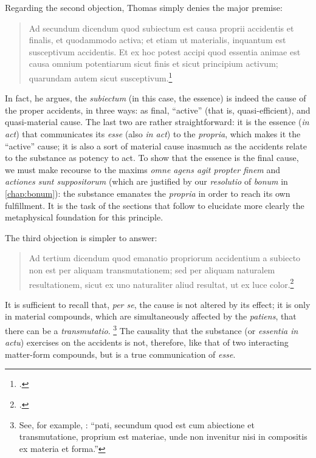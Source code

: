 Regarding the second objection, Thomas simply denies the major premise:
%
\begin{quotation}
Ad secundum dicendum quod subiectum est causa proprii accidentis et finalis, et quodammodo activa; et etiam ut materialis, inquantum est susceptivum accidentis. Et ex hoc potest accipi quod essentia animae est causa omnium potentiarum sicut finis et sicut principium activum; quarundam autem sicut susceptivum.\footcite[I, q.~77, a.~6, ad 2]{st:summa}
\end{quotation}
%
In fact, he argues, the \emph{subiectum} (in this case, the essence) is indeed the cause of the proper accidents, in three ways: as final, ``active'' (that is, quasi-efficient), and quasi-material cause. The last two are rather straightforward: it is the essence (\emph{in act}) that communicates its \emph{esse} (also \emph{in act}) to the \emph{propria}, which makes it the ``active'' cause; it is also a sort of material cause inasmuch as the accidents relate to the substance as potency to act. To show that the essence is the final cause, we must make recourse to the maxims \emph{omne agens agit propter finem} and \emph{actiones sunt suppositorum} (which are justified by our \emph{resolutio} of \emph{bonum} in \autoref{chap:bonum}): the substance emanates the \emph{propria} in order to reach its own fulfillment. It is the task of the sections that follow to elucidate more clearly the metaphysical foundation for this principle.

The third objection is simpler to answer: 
%
\begin{quotation}
Ad tertium dicendum quod emanatio propriorum accidentium a subiecto non est per aliquam transmutationem; sed per aliquam naturalem resultationem, sicut ex uno naturaliter aliud resultat, ut ex luce color.\footcite[I, q.~77, a.~6, ad 3]{st:summa}
\end{quotation}
%
It is sufficient to recall that, \emph{per se}, the cause is not altered by its effect; it is only in material compounds, which are simultaneously affected by the \emph{patiens}, that there can be a \emph{transmutatio}.%
%
\footnote{See, for example, \cite[I-II, q.~22, a.~1, ad~1]{st:summa}: ``pati, secundum quod est cum abiectione et transmutatione, proprium est materiae, unde non invenitur nisi in compositis ex materia et forma.''} The causality that the substance (or \emph{essentia in actu})  exercises on the accidents is not, therefore, like that of two interacting matter-form compounds, but is a true communication of \emph{esse}.

